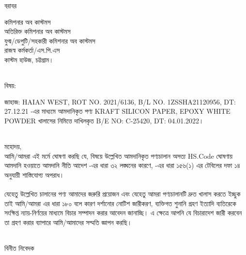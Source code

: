 \documentclass[12pt]{article}
\newcommand{\good}{KRAFT SILICON PAPER, EPOXY WHITE POWDER}
\newcommand{\vessel}{HAIAN WEST}
\newcommand{\blno}{1ZSSHA21120956}
\newcommand{\bldt}{27.12.21}
\newcommand{\beno}{C-25420}
\newcommand{\bedt}{04.01.2022}
\newcommand{\menifest}{2021/6136}
\begin{document}
\noindent
বরাবর
\\
\begin{minipage}[t]{0.06\linewidth}
\hspace{1em}
\end{minipage}
\begin{minipage}[t]{0.94\linewidth}
কমিশনার অব কাস্টমস
\\
অতিরিক্ত কমিশনার অব কাস্টমস
\\
যুগ্ম/ডেপুটি/সহকারী কমিশনার অব কাস্টমস
\\
রাজস্ব কর্মকর্তা/এস.পি.এস
\\
কাস্টম হাউজ,
চট্টগ্রাম।
\\
\\
\end{minipage}
\begin{minipage}[t]{0.06\linewidth}
বিষয়:
\end{minipage}
\begin{minipage}[t]{0.94\linewidth}
জাহাজ: {\vessel},
ROT NO. {\menifest},
B/L NO. {\blno},
DT: {\bldt}
-এর মাধ্যমে আমদানিকৃত পণ্য
{\good}
খালাসের নিমিত্তে
দাখিলকৃত
B/E NO: {\beno}, DT: {\bedt}।
\\
\\
\end{minipage}
মহোদয়,
\\
\hspace*{2.7em}আমি/আমরা এই মর্মে
ঘোষণা করছি যে, বিষয়ে উল্লেখিত আমদানিকৃত পণ্যচালান অসত্য
HS.Code
ঘোষণায়  আমদানি হওয়াতে
আমদানি নীতি আদেশ -এর ধারা ৩২ লঙ্ঘনের কারণে,
{\tca} -এর ধারা ১৫৬(১) এর টেবিলের দফা ১৪ অনুযায়ী
শাস্তিযোগ্য অপরাধ।
\\
\\
\hspace*{2.7em}
যেহেতু উল্লেখিত চালানের পণ্য আমাদের জরুরি প্রয়োজন
এবং যেহেতু আমরা পণ্যচালানটি দ্রুত খালাস করতে ইচ্ছুক
তাই আমি/আমরা {\tca} এর ধারা ১৮০ বলে কারণ দর্শানোর
নোটিশ জারীকরণ, ব্যক্তিগত শুনানি গ্রহণ ইত্যাদি ব্যতিরেকে
সংক্ষিপ্ত ন্যায়-নির্ণয়ের মাধ্যমে বিচার সম্পাদন করার আবেদন
জানাচ্ছি।
এ ক্ষেত্রে আপনি যে বিচারাদেশ জারী করবেন তা গ্রহণ করার
ব্যাপারে আমি/আমাদের সম্মতি জ্ঞাপন করছি।
\\
\\
\begin{minipage}[t]{0.55\linewidth}
\hspace{1em}
\end{minipage}
\begin{minipage}[t]{0.45\linewidth}
বিনীত নিবেদক
\\
\\
\\
\end{minipage}
\end{document}
